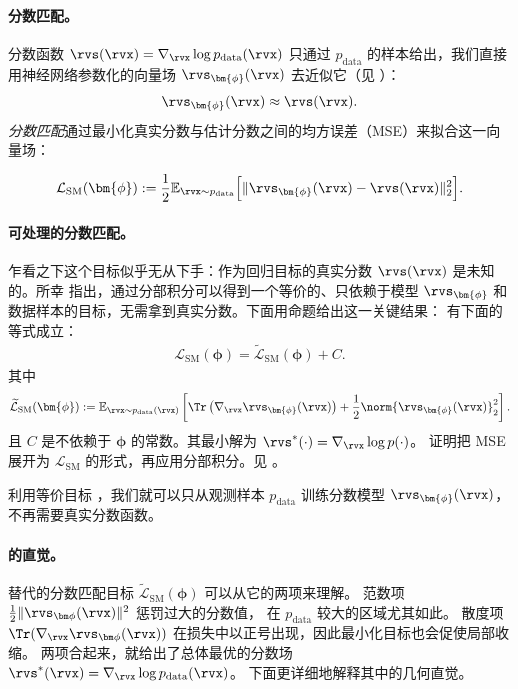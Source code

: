\paragraph{分数匹配。}
分数函数 $\rvs(\rvx) = \nabla_{\rvx} \log p_{\mathrm{data}}(\rvx)$ 只通过 $p_{\mathrm{data}}$ 的样本给出，我们直接用神经网络参数化的向量场 $\rvs_{\bm{\phi}}(\rvx)$ 去近似它（见 ）：
\[
\rvs_{\bm{\phi}}(\rvx) \approx \rvs(\rvx).
\]
\emph{分数匹配}通过最小化真实分数与估计分数之间的均方误差（MSE）来拟合这一向量场：
\begin{mdframed}
\begin{align}\label{eq:sm}
    \mathcal{L}_{\mathrm{SM}}(\bm{\phi})
    := \frac{1}{2}  \mathbb{E}_{\rvx \sim p_{\mathrm{data}}}
    \Big[\| \rvs_{\bm{\phi}}(\rvx) - \rvs(\rvx)\|_2^2\Big].
\end{align}
\end{mdframed}

\paragraph{可处理的分数匹配。}
乍看之下这个目标似乎无从下手：作为回归目标的真实分数
$\rvs(\rvx)$ 是未知的。所幸 \citet{hyvarinen2005estimation} 指出，通过分部积分可以得到一个等价的、只依赖于模型 $\rvs_{\bm{\phi}}$ 和数据样本的目标，无需拿到真实分数。下面用命题给出这一关键结果：
        {
        有下面的等式成立：
        \begin{align*}
            \mathcal{L}_{\text{SM}}(\bm{\phi}) = \widetilde{\mathcal{L}}_{\text{SM}}(\bm{\phi}) + C.
        \end{align*}
        其中
        \begin{align}\label{eq:sm-alternative}
            \widetilde{\mathcal{L}}_{\text{SM}}(\bm{\phi})
            := \mathbb{E}_{\rvx \sim p_{\text{data}}(\rvx)} \left[
            \Tr\left(\nabla_{\rvx}\rvs_{\bm{\phi}}(\rvx)\right)
            + \frac{1}{2} \norm{\rvs_{\bm{\phi}}(\rvx)}_2^2
            \right].
        \end{align}
        且 $C$ 是不依赖于 $\bm{\phi}$ 的常数。其最小解为 $\rvs^*(\cdot) = \nabla_{\rvx} \log p(\cdot)$。
        }
        {证明把 MSE 展开为 $ \mathcal{L}_{\text{SM}} $ 的形式，再应用分部积分。见 。
        }

利用等价目标 ，我们就可以只从观测样本 $p_{\mathrm{data}}$ 训练分数模型 $\rvs_{\bm{\phi}}(\rvx)$，不再需要真实分数函数。

\paragraph{ 的直觉。}
替代的分数匹配目标 $\widetilde{\mathcal{L}}_{\text{SM}}(\bm\phi)$
可以从它的两项来理解。
范数项 $\tfrac12\|\rvs_{\bm\phi}(\rvx)\|^2$ 惩罚过大的分数值，
在 $p_{\mathrm{data}}$ 较大的区域尤其如此。
散度项 $\Tr(\nabla_{\rvx} \rvs_{\bm\phi}(\rvx))$ 在损失中以正号出现，因此最小化目标也会促使局部收缩。
两项合起来，就给出了总体最优的分数场
$\rvs^*(\rvx)=\nabla_{\rvx}\log p_{\mathrm{data}}(\rvx)$。
下面更详细地解释其中的几何直觉。

